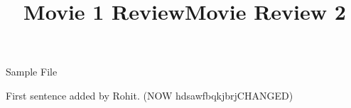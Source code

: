 \documentclass{article}
\begin{document}
\title{Movie 1 Review}


\centerline{\sc \large Sample File}
\vspace{.5pc}
\centerline{\sc }
\vspace{2pc}
\title{Movie Review 2}

First sentence added by Rohit. (NOW hdsawfbqkjbrjCHANGED)
\end{document}
